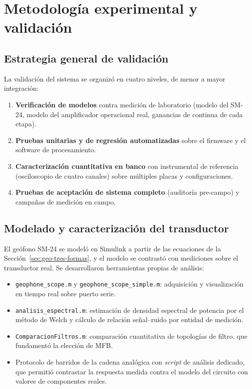 \section{Metodolog\'ia experimental y validaci\'on}
\label{sec:metodologia}

\subsection{Estrategia general de validaci\'on}

La validaci\'on del sistema se organiz\'o en cuatro niveles, de menor a mayor integraci\'on:

\begin{enumerate}[itemsep=0.15em]
    \item \textbf{Verificaci\'on de modelos} contra medici\'on de laboratorio (modelo del
    SM-24, modelo del amplificador operacional real, ganancias de continua de cada etapa).
    \item \textbf{Pruebas unitarias y de regresi\'on automatizadas} sobre el firmware y el
    software de procesamiento.
    \item \textbf{Caracterizaci\'on cuantitativa en banco} con instrumental de referencia
    (osciloscopio de cuatro canales) sobre m\'ultiples placas y configuraciones.
    \item \textbf{Pruebas de aceptaci\'on de sistema completo} (auditor\'ia pre-campo) y
    campa\~nas de medici\'on en campo.
\end{enumerate}

\subsection{Modelado y caracterizaci\'on del transductor}

El ge\'ofono SM-24 se model\'o en Simulink a partir de las ecuaciones de la
Secci\'on~\ref{sec:geo-tres-formas}, y el
modelo se contrast\'o con mediciones sobre el transductor real. Se desarrollaron
herramientas propias de an\'alisis:

\begin{itemize}[itemsep=0.15em]
    \item \texttt{geophone\_scope.m} y \texttt{geophone\_scope\_simple.m}: adquisici\'on y
    visualizaci\'on en tiempo real sobre puerto serie.
    \item \texttt{analisis\_espectral.m}: estimaci\'on de densidad espectral de potencia
    por el m\'etodo de Welch y c\'alculo de relaci\'on se\~nal--ruido por entidad de medici\'on.
    \item \texttt{ComparacionFiltros.m}: comparaci\'on cuantitativa de topolog\'ias de
    filtro, que fundament\'o la elecci\'on de MFB.
    \item Protocolo de barridos de la cadena anal\'ogica con \emph{script} de an\'alisis
    dedicado, que permiti\'o contrastar la respuesta medida contra el modelo del circuito
    con valores de componentes reales.
\end{itemize}

